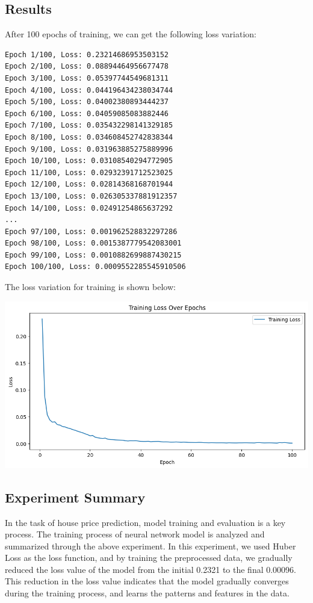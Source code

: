 \documentclass[a4paper,12pt]{article}
\begin{document}
\subsection{Results}
After 100 epochs of training, we can get the following loss variation:
\begin{lstlisting}
Epoch 1/100, Loss: 0.23214686953503152
Epoch 2/100, Loss: 0.08894464956677478
Epoch 3/100, Loss: 0.05397744549681311
Epoch 4/100, Loss: 0.044196434238034744
Epoch 5/100, Loss: 0.04002380893444237
Epoch 6/100, Loss: 0.04059085083882446
Epoch 7/100, Loss: 0.035432298141329185
Epoch 8/100, Loss: 0.034608452742838344
Epoch 9/100, Loss: 0.031963885275889996
Epoch 10/100, Loss: 0.03108540294772905
Epoch 11/100, Loss: 0.02932391712523025
Epoch 12/100, Loss: 0.02814368168701944
Epoch 13/100, Loss: 0.026305337881912357
Epoch 14/100, Loss: 0.02491254865637292
...
Epoch 97/100, Loss: 0.001962528832297286
Epoch 98/100, Loss: 0.0015387779542083001
Epoch 99/100, Loss: 0.0010882699887430215
Epoch 100/100, Loss: 0.0009552285545910506
\end{lstlisting}
The loss variation for training is shown below:

\centering %
\includegraphics[width=0.8\linewidth]{images/lab1_4_loss.png}
\justifying






\subsection{Experiment Summary}
In the task of house price prediction, model training and evaluation is a key process. The training process of neural network model is analyzed and summarized through the above experiment. In this experiment, we used Huber Loss as the loss function, and by training the preprocessed data, we gradually reduced the loss value of the model from the initial 0.2321 to the final 0.00096. This reduction in the loss value indicates that the model gradually converges during the training process, and learns the patterns and features in the data.
\end{document}
